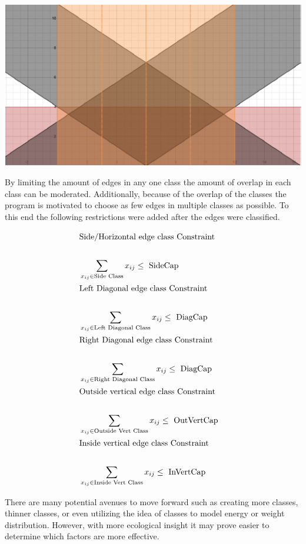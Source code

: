 \documentclass[letterpaper,11pt]{texMemo} %
\begin{document}
\begin{center}
\includegraphics[scale=1]{Daylight.png}
\end{center}

By limiting the amount of edges in any one class the amount of overlap in each class can be moderated. Additionally, because of the overlap of the classes the program is motivated to choose as few edges in multiple classes as possible.
To this end the following restrictions were added after the edges were classified.

\begin{align*}
\intertext{Side/Horizontal edge class Constraint}\\
& \sum\limits_{x_{ij}\in\text{Side Class}} x_{ij}\leq\text{ SideCap} \\
\intertext{Left Diagonal edge class Constraint}\\
& \sum\limits_{x_{ij}\in\text{Left Diagonal Class}} x_{ij} \leq\text{ DiagCap}\\
\intertext{Right Diagonal edge class Constraint}\\
& \sum\limits_{x_{ij}\in\text{Right Diagonal Class}} x_{ij} \leq\text{ DiagCap} \\
\intertext{Outside vertical edge class Constraint}\\
& \sum\limits_{x_{ij}\in\text{Outside Vert Class}} x_{ij} \leq\text{ OutVertCap}\\
\intertext{Inside vertical edge class Constraint}\\
& \sum\limits_{x_{ij}\in\text{Inside Vert Class}} x_{ij} \leq\text{ InVertCap}\\
\end{align*}

There are many potential avenues to move forward such as creating more classes, thinner classes,
or even utilizing the idea of classes to model energy or weight distribution. However, with more
ecological insight it may prove easier to determine which factors are more effective.
\end{document}
